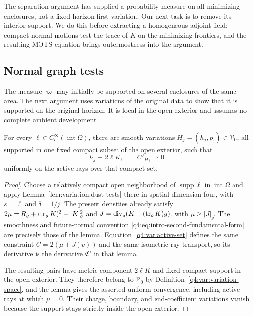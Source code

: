 The separation argument has supplied a probability measure on all
minimizing enclosures, not a fixed-horizon first variation. Our next task
is to remove its interior support. We do this before extracting a
homogeneous adjoint field: compact normal motions test the trace of $K$
on the minimizing frontiers, and the resulting MOTS equation brings
outermostness into the argument.

\subsection{Normal graph tests}

The measure $\varpi$ may initially be supported on several enclosures of
the same area. The next argument uses variations of the original data to
show that it is supported on the original horizon. It is local in the open
exterior and assumes no complete ambient development.

\begin{lemma}
\label{q4:var:normal-tests}
For every $\ell\in C^\infty_c(\operatorname{int}\Omega)$, there are smooth
variations $H_j=(h_j,p_j)\in\mathcal V_0$, all supported in one fixed
compact subset of the open exterior, such that
\[
 h_j=2\ell K,\qquad C'_{H_j}\longrightarrow0
\]
uniformly on the active rays over that compact set.
\end{lemma}

\begin{proof}
Choose a relatively compact open neighborhood of
$\operatorname{supp}\ell$ in $\operatorname{int}\Omega$ and apply
Lemma~\ref{lem:variation:dust-tests} there in spatial dimension four,
with $s=\ell$ and $\delta=1/j$. The present densities already satisfy
$2\mu=R_g+(\operatorname{tr}_gK)^2-|K|_g^2$ and
$J=\operatorname{div}_g(K-(\operatorname{tr}_gK)g)$, with $\mu\ge|J|_g$.
The smoothness and future-normal convention
\eqref{q4:eq:intro-second-fundamental-form} are precisely those of the
lemma. Equation~\eqref{q4:var:active-set} defines the same constraint
$C=2(\mu+J(v))$ and the same isometric ray transport, so its derivative
is the derivative $\mathfrak C'$ in that lemma.

The resulting pairs have metric component $2\ell K$ and fixed compact
support in the open exterior. They therefore belong to $\mathcal V_0$
by Definition~\ref{q4:var:variation-space}, and the lemma gives the
asserted uniform convergence, including active rays at which $\mu=0$.
Their charge, boundary, and end-coefficient variations vanish because
the support stays strictly inside the open exterior.
\end{proof}

